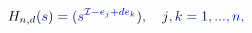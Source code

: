 \documentclass[12pt]{article}
\begin{document}
\makeatletter
\renewcommand*{\@textcolor}[3]{%
  \protect\leavevmode
  \begingroup
    \color#1{#2}#3%
  \endgroup
}
\makeatother
\begin{displaymath}
\mathcolor[RGB]{0,0,15}{H} _ { \mathcolor[RGB]{0,0,30}{n} \mathcolor[RGB]{0,0,45}{,} \mathcolor[RGB]{0,0,60}{d} } \mathcolor[RGB]{0,0,75}{(} \mathcolor[RGB]{0,0,90}{s} \mathcolor[RGB]{0,0,105}{)} \mathcolor[RGB]{0,0,120}{=} \mathcolor[RGB]{0,0,135}{(} \mathcolor[RGB]{0,0,150}{s} ^ { \mathcal { \mathcolor[RGB]{0,0,165}{I} } \mathcolor[RGB]{0,0,180}{-} \mathcolor[RGB]{0,0,195}{e} _ { \mathcolor[RGB]{0,0,210}{j} } \mathcolor[RGB]{0,0,225}{+} \mathcolor[RGB]{0,0,240}{d} \mathcolor[RGB]{0,0,255}{e} _ { \mathcolor[RGB]{0,15,0}{k} } } \mathcolor[RGB]{0,15,15}{)} \mathcolor[RGB]{0,15,30}{,} \quad \mathcolor[RGB]{0,15,45}{j} \mathcolor[RGB]{0,15,60}{,} \mathcolor[RGB]{0,15,75}{k} \mathcolor[RGB]{0,15,90}{=} \mathcolor[RGB]{0,15,105}{1} \mathcolor[RGB]{0,15,120}{,} \mathcolor[RGB]{0,15,135}{.} \mathcolor[RGB]{0,15,150}{.} \mathcolor[RGB]{0,15,165}{.} \mathcolor[RGB]{0,15,180}{,} \mathcolor[RGB]{0,15,195}{n} \mathcolor[RGB]{0,15,210}{,}
\end{displaymath}
\end{document}
